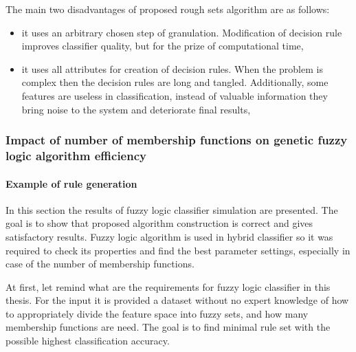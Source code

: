 The main two disadvantages of proposed rough sets algorithm are as follows:
\begin{itemize}
    \item it uses an arbitrary chosen step of granulation. Modification of 
        decision rule improves classifier quality, but for the prize of
        computational time,
    \item it uses all attributes for creation of decision rules. When the 
        problem is complex then the decision rules are long and tangled. 
        Additionally, some features are useless in classification, instead of valuable
        information they bring noise to the system and deteriorate final
        results,
\end{itemize}

\subsubsection{Impact of number of membership functions on genetic fuzzy logic algorithm efficiency}
\label{cha:Simulation_reaearch_3}
\paragraph{Example of rule generation}
In this section the results of fuzzy logic classifier simulation are presented.
The goal is to show that proposed algorithm construction is correct and gives
satisfactory results. Fuzzy logic algorithm is used in hybrid classifier so it
was required to check its properties and find the best parameter settings,
especially in case of the number of membership functions.

At first, let remind what are the requirements for fuzzy logic classifier in
this thesis. For the input it is provided a dataset without no expert knowledge 
of how to appropriately divide the feature space into fuzzy sets, and how many membership
functions are need. The goal is to find minimal rule set with the possible highest
classification accuracy. 

